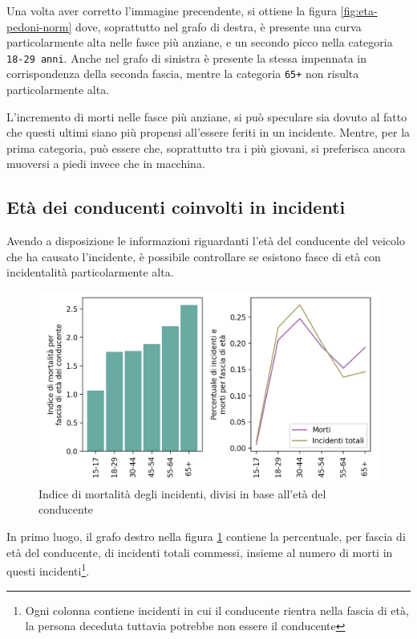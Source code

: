 \documentclass[a4paper]{report}
\newcommand{\columnstyle}[1]{\texttt{#1}}
\begin{document}
Una volta aver corretto l'immagine precendente, 
si ottiene la figura \ref{fig:eta-pedoni-norm} dove, soprattutto 
nel grafo di destra, è presente una curva particolarmente alta 
nelle fasce più anziane, e un secondo picco nella categoria \columnstyle{18-29 anni}.
Anche nel grafo di sinistra è presente la stessa impennata in corrispondenza 
della seconda fascia, mentre la categoria \columnstyle{65+} non 
risulta particolarmente alta.

L'incremento di morti nelle fasce più anziane, si può speculare sia dovuto al 
fatto che questi ultimi siano più propensi all'essere feriti in un incidente. 
Mentre, per la prima categoria, può essere che, soprattutto tra i più giovani, 
si preferisca ancora muoversi a piedi invece che in macchina.

\subsection{Età dei conducenti coinvolti in incidenti}

Avendo a disposizione le informazioni riguardanti l'età del conducente del 
veicolo che ha causato l'incidente, è possibile controllare se esistono fasce di 
età con incidentalità particolarmente alta.

\begin{figure}
    \includegraphics[width=\linewidth]{../src/incidenti/incidenti_senza_coords/mortalita/indice_mortalita_eta.png}
    \caption{Indice di mortalità degli incidenti, divisi in base all'età del conducente}
    \label{fig:indice-mortalita-eta}
\end{figure}

In primo luogo, il grafo destro nella figura \ref{fig:indice-mortalita-eta} contiene 
la percentuale, per fascia di età del conducente, di incidenti totali commessi, insieme 
al numero di morti in questi incidenti\footnote{Ogni colonna contiene incidenti in 
cui il conducente rientra nella fascia di età, la persona deceduta tuttavia potrebbe non 
essere il conducente}.
\end{document}
